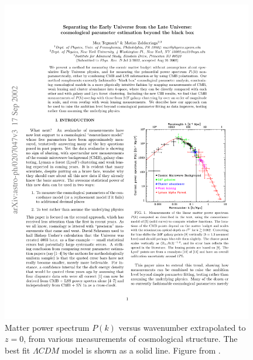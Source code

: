 \begin{figure}
\centering
\includegraphics[width=110mm]{./plots/pk.pdf}
\caption{Matter power spectrum $P(k)$ versus wavenumber extrapolated to $z=0$, from various measurements of cosmological structure. The best fit $\Lambda CDM$ model is shown as a solid line. Figure from \citet{Tegmark2002b}.}
\label{fig:pk}
\end{figure}

